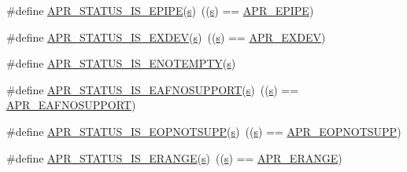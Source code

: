 \begin{DoxyCompactItemize}
\item 
\#define \hyperlink{group__APR__STATUS__IS_gad1c0cf4e5619025a87c8edfc668d49f6}{A\+P\+R\+\_\+\+S\+T\+A\+T\+U\+S\+\_\+\+I\+S\+\_\+\+E\+P\+I\+PE}(\hyperlink{pcretest_8txt_a062597889ba244b72877454b1d3adecf}{s})~((\hyperlink{pcretest_8txt_a062597889ba244b72877454b1d3adecf}{s}) == \hyperlink{group__APR__Error_gae985330e30e374714ff1742485597f5d}{A\+P\+R\+\_\+\+E\+P\+I\+PE})
\item 
\#define \hyperlink{group__APR__STATUS__IS_ga1a11d6ff007e40f93f9db1b3c6e76617}{A\+P\+R\+\_\+\+S\+T\+A\+T\+U\+S\+\_\+\+I\+S\+\_\+\+E\+X\+D\+EV}(\hyperlink{pcretest_8txt_a062597889ba244b72877454b1d3adecf}{s})~((\hyperlink{pcretest_8txt_a062597889ba244b72877454b1d3adecf}{s}) == \hyperlink{group__APR__Error_ga0562023bd8ebe580b9bbb9f7b04d3f5d}{A\+P\+R\+\_\+\+E\+X\+D\+EV})
\item 
\#define \hyperlink{group__APR__STATUS__IS_ga6cced4e794d3e7ed6dae3e53c337cc02}{A\+P\+R\+\_\+\+S\+T\+A\+T\+U\+S\+\_\+\+I\+S\+\_\+\+E\+N\+O\+T\+E\+M\+P\+TY}(\hyperlink{pcretest_8txt_a062597889ba244b72877454b1d3adecf}{s})
\item 
\#define \hyperlink{group__APR__STATUS__IS_ga9309aade5bd335ac5233170e8c120cb9}{A\+P\+R\+\_\+\+S\+T\+A\+T\+U\+S\+\_\+\+I\+S\+\_\+\+E\+A\+F\+N\+O\+S\+U\+P\+P\+O\+RT}(\hyperlink{pcretest_8txt_a062597889ba244b72877454b1d3adecf}{s})~((\hyperlink{pcretest_8txt_a062597889ba244b72877454b1d3adecf}{s}) == \hyperlink{group__APR__Error_ga76b558840838bcb94a4811a8e52df7a6}{A\+P\+R\+\_\+\+E\+A\+F\+N\+O\+S\+U\+P\+P\+O\+RT})
\item 
\#define \hyperlink{group__APR__STATUS__IS_ga6180aadcf4411304443a974dfff172af}{A\+P\+R\+\_\+\+S\+T\+A\+T\+U\+S\+\_\+\+I\+S\+\_\+\+E\+O\+P\+N\+O\+T\+S\+U\+PP}(\hyperlink{pcretest_8txt_a062597889ba244b72877454b1d3adecf}{s})~((\hyperlink{pcretest_8txt_a062597889ba244b72877454b1d3adecf}{s}) == \hyperlink{group__APR__Error_ga6f02032ddad10077dbc9872ec4a6030e}{A\+P\+R\+\_\+\+E\+O\+P\+N\+O\+T\+S\+U\+PP})
\item 
\#define \hyperlink{group__APR__STATUS__IS_ga0ffdf19bbd21e9c1aae55917dce00d91}{A\+P\+R\+\_\+\+S\+T\+A\+T\+U\+S\+\_\+\+I\+S\+\_\+\+E\+R\+A\+N\+GE}(\hyperlink{pcretest_8txt_a062597889ba244b72877454b1d3adecf}{s})~((\hyperlink{pcretest_8txt_a062597889ba244b72877454b1d3adecf}{s}) == \hyperlink{group__APR__Error_gaa8522357f7cc63343895901d107b0222}{A\+P\+R\+\_\+\+E\+R\+A\+N\+GE})
\end{DoxyCompactItemize}



